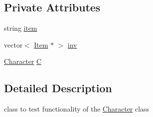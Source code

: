 \subsection*{Private Attributes}
\begin{DoxyCompactItemize}
\item 
string \hyperlink{classCharacterTest_aee8b109b66e2f22ba5de6abaaba47160}{item}
\item 
vector$<$ \hyperlink{classItem}{Item} $\ast$ $>$ \hyperlink{classCharacterTest_a23af9da0d443fb16273ed269b8a91e8b}{inv}
\item 
\hyperlink{classCharacter}{Character} \hyperlink{classCharacterTest_a2afd29afdeb90cbac6ac18a71ef7e23a}{C}
\end{DoxyCompactItemize}


\subsection{Detailed Description}
class to test functionality of the \hyperlink{classCharacter}{Character} class 

